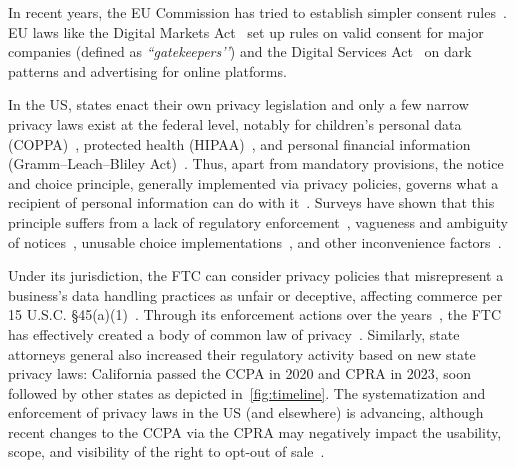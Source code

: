 In recent years, the EU Commission %
has tried to establish simpler consent rules~\cite{europeancommissionCookiePledgeEuropean2023}. EU laws like the Digital Markets Act~\cite{RegulationEU20222022} set up rules on valid consent for major companies (defined as \textit{``gatekeepers’’}) and the Digital Services Act~\cite{RegulationEU20222022a} on dark patterns and advertising for online platforms.

\label{sec:us-regulations}
In the US, states enact their own privacy legislation and only a few narrow privacy laws exist at the federal level, notably for children’s personal data (COPPA)~\cite{ChildrensOnlinePrivacy2013}, protected health (HIPAA)~\cite{rightsocrHIPAAPrivacyRule2008}, and personal financial information (Gramm–Leach–Bliley Act)~\cite{GrammLeachBlileyAct2013}. Thus, apart from mandatory provisions, the notice and choice principle, generally implemented via privacy policies, governs what a recipient of personal information can do with it~\cite{zimmeckInformationPrivacyLaw2013,schaubDesignSpaceEffective2015}. 
%
Surveys have shown that this principle suffers from a lack of regulatory enforcement~\cite{cranorNecessaryNotSufficient2012}, vagueness and ambiguity of notices~\cite{reidenbergAmbiguityPrivacyPolicies2016}, unusable choice implementations~\cite{habibItsScavengerHunt2020}, and other inconvenience factors~\cite{oconnorUnclearInconspicuousRight2021}.

Under its jurisdiction, the FTC can consider privacy policies that misrepresent a business's data handling practices as unfair or deceptive, affecting commerce per 15 U.S.C. §45(a)(1)~\cite{unitedstates:congress:houseofrepresentatives:officeofthelawrevisioncounselUnfairMethodsCompetition2023}. Through its enforcement actions over the years~\cite{ftcSnapchatSettlesFTC2014,FTCImposes52019}, the FTC has effectively created a body of common law of privacy~\cite{soloveFTCNewCommon2013}.  
%
Similarly, state attorneys general also increased their regulatory activity based on new state privacy laws: California passed the CCPA in 2020 and CPRA in 2023, soon followed by other states as depicted in~\autoref{fig:timeline}.
%
The systematization and enforcement of privacy laws in the US (and elsewhere) is advancing, although recent changes to the CCPA via the CPRA may negatively impact the usability, scope, and visibility of the right to opt-out of sale~\cite{charatanTwoStepsForward2024}.

